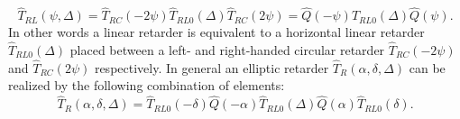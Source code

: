 \begin{equation}
    \hat{T}_{RL}(\psi, \Delta)=\hat{T}_{RC}(-2\psi)\hat{T}_{RL0}(\Delta)\hat{T}_{RC}(2\psi)=
    \hat{Q}(-\psi)\hat{T}_{RL0}(\Delta)\hat{Q}(\psi).
\end{equation}
In other words a linear retarder is equivalent to a horizontal linear retarder $\hat{T}_{RL0}(\Delta)$ placed between a left- and right-handed circular retarder $\hat{T}_{RC}(-2\psi)$ and $\hat{T}_{RC}(2\psi)$ respectively. In general an elliptic retarder $\hat{T}_R(\alpha, \delta, \Delta)$ can be realized by the following combination of elements:
\begin{equation}
    \hat{T}_R(\alpha, \delta, \Delta)=
    \hat{T}_{RL0}(-\delta)\hat{Q}(-\alpha)\hat{T}_{RL0}(\Delta)\hat{Q}(\alpha)\hat{T}_{RL0}(\delta).
\end{equation}

